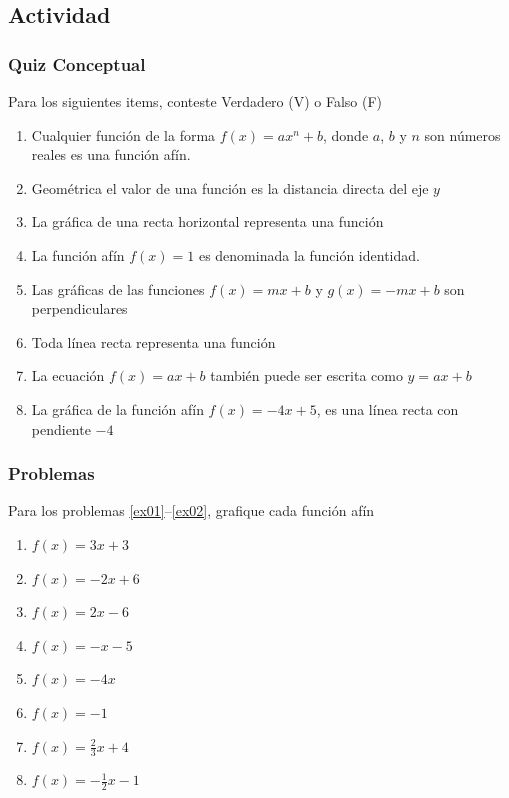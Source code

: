 \documentclass[letterpaper,11pt,twoside]{article}
\begin{document}
\begin{multicols}{2}
 \subsection*{Actividad}
 \subsubsection*{Quiz Conceptual}
 Para los siguientes items, conteste Verdadero (V) o Falso (F)
 \begin{enumerate}
 \item Cualquier función de la forma $f(x)=ax^{n}+b$, donde $a$, $b$ y $n$ son números reales es una función afín.
 \item Geométrica el valor de una función es la distancia directa del eje $y$
 \item La gráfica de una recta horizontal representa una función
 \item La función afín $f(x)=1$ es denominada la función identidad.
 \item Las gráficas de las funciones $f(x)=mx+b$ y $g(x)=-mx+b$ son perpendiculares
 \item Toda línea recta representa una función
 \item La ecuación $f(x)=ax+b$ también puede ser escrita como $y=ax+b$
 \item La gráfica de la función afín $f(x)=-4x+5$, es una línea recta con pendiente $-4$
 \end{enumerate}
 \subsubsection*{Problemas}
 Para los problemas \ref{ex01}--\ref{ex02}, grafique cada función afín
 \begin{enumerate}
 \item $f(x)=3x+3$ \label{ex01}
 \item $f(x)=-2x+6$
 \item $f(x)=2x-6$
 \item $f(x)=-x-5$
 \item $f(x)=-4x$
 \item $f(x)=-1$
 \item $f(x)=\frac{2}{3}x+4$
 \item $f(x)=-\frac{1}{2}x-1$\label{ex02}
 \end{enumerate}
 \end{multicols}
\end{document}
